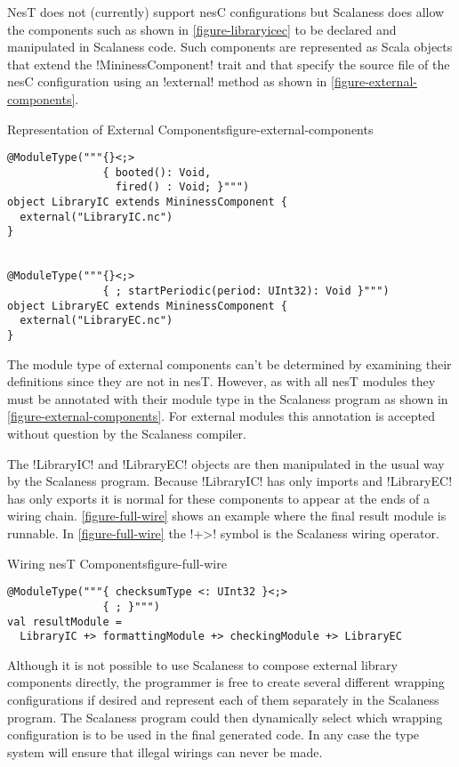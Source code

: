 NesT does not (currently) support nesC configurations but Scalaness does allow the components
such as shown in \autoref{figure-libraryicec} to be declared and manipulated in Scalaness code.
Such components are represented as Scala objects that extend the !MininessComponent! trait and
that specify the source file of the nesC configuration using an !external! method as shown in
\autoref{figure-external-components}.

\singlespace
\begin{fpfig}[tbhp]{Representation of External Components}{figure-external-components}
{
\begin{lstlisting}[language=scalaness]
@ModuleType("""{}<;>
               { booted(): Void,
                 fired() : Void; }""")
object LibraryIC extends MininessComponent {
  external("LibraryIC.nc")
}


@ModuleType("""{}<;>
               { ; startPeriodic(period: UInt32): Void }""")
object LibraryEC extends MininessComponent {
  external("LibraryEC.nc")
}
\end{lstlisting}
}
\end{fpfig}
\primaryspacing

The module type of external components can't be determined by examining their definitions since
they are not in nesT. However, as with all nesT modules they must be annotated with their module
type in the Scalaness program as shown in \autoref{figure-external-components}. For external
modules this annotation is accepted without question by the Scalaness compiler.

The !LibraryIC! and !LibraryEC! objects are then manipulated in the usual way by the Scalaness
program. Because !LibraryIC! has only imports and !LibraryEC! has only exports it is normal for
these components to appear at the ends of a wiring chain. \autoref{figure-full-wire} shows an
example where the final result module is runnable. In \autoref{figure-full-wire} the !+>! symbol
is the Scalaness wiring operator.

\singlespace
\begin{fpfig}[tbhp]{Wiring nesT Components}{figure-full-wire}
{
\begin{lstlisting}[language=scalaness]
@ModuleType("""{ checksumType <: UInt32 }<;>
               { ; }""")
val resultModule =
  LibraryIC +> formattingModule +> checkingModule +> LibraryEC
\end{lstlisting}
}
\end{fpfig}
\primaryspacing

Although it is not possible to use Scalaness to compose external library components directly,
the programmer is free to create several different wrapping configurations if desired and
represent each of them separately in the Scalaness program. The Scalaness program could then
dynamically select which wrapping configuration is to be used in the final generated code. In
any case the type system will ensure that illegal wirings can never be made.

